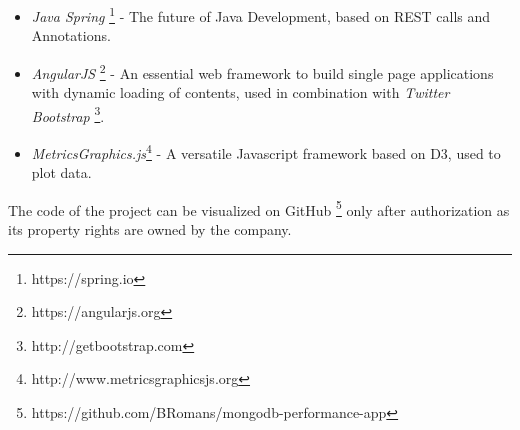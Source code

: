 \begin{itemize}
    \item \textit{Java Spring} \footnote{https://spring.io} - The future of Java Development, based on REST calls and Annotations.
    \item \textit{AngularJS} \footnote{https://angularjs.org} - An essential web framework to build single page applications with dynamic loading of contents, used in combination with \textit{Twitter Bootstrap} \footnote{http://getbootstrap.com}.
    \item \textit{MetricsGraphics.js}\footnote{http://www.metricsgraphicsjs.org} - A versatile Javascript framework based on D3, used to plot data.
\end{itemize}
The code of the project can be visualized on GitHub \footnote{https://github.com/BRomans/mongodb-performance-app} only after authorization as its property rights are owned by the company.
\ \clearpage




